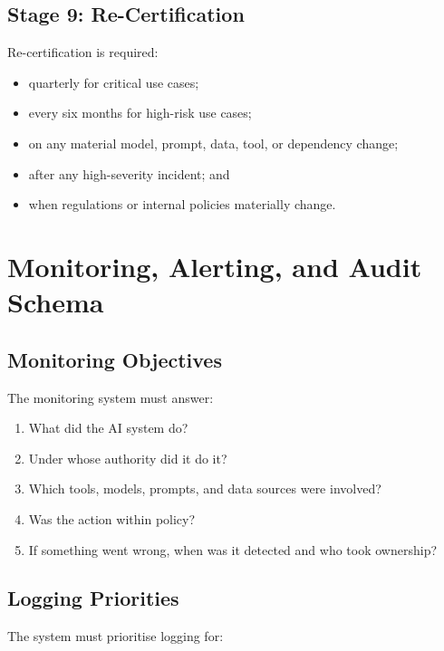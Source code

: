 \documentclass[11pt,a4paper]{article}
\begin{document}
\subsection{Stage 9: Re-Certification}

Re-certification is required:

\begin{itemize}[nosep]
    \item quarterly for critical use cases;
    \item every six months for high-risk use cases;
    \item on any material model, prompt, data, tool, or dependency change;
    \item after any high-severity incident; and
    \item when regulations or internal policies materially change.
\end{itemize}

\section{Monitoring, Alerting, and Audit Schema}

\subsection{Monitoring Objectives}

The monitoring system must answer:

\begin{enumerate}[nosep]
    \item What did the AI system do?
    \item Under whose authority did it do it?
    \item Which tools, models, prompts, and data sources were involved?
    \item Was the action within policy?
    \item If something went wrong, when was it detected and who took ownership?
\end{enumerate}

\subsection{Logging Priorities}

The system must prioritise logging for:
\end{document}

